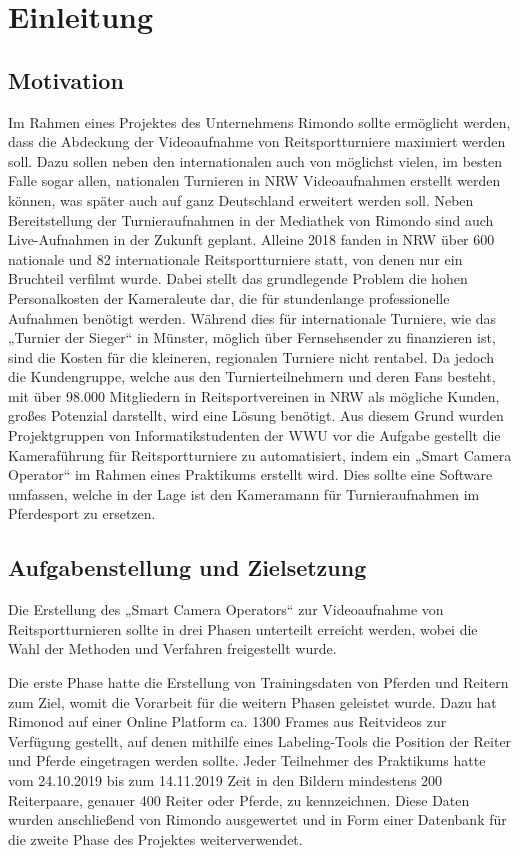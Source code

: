 \chapter{Einleitung}


\section{Motivation}

Im Rahmen eines Projektes des Unternehmens Rimondo sollte ermöglicht werden, dass die Abdeckung der Videoaufnahme von Reitsportturniere maximiert werden soll. Dazu sollen neben den internationalen auch von möglichst vielen, im besten Falle sogar allen, nationalen Turnieren in NRW Videoaufnahmen erstellt werden können, was später auch auf ganz Deutschland erweitert werden soll. Neben Bereitstellung der Turnieraufnahmen in der Mediathek von Rimondo sind auch Live-Aufnahmen in der Zukunft geplant. Alleine 2018 fanden in NRW über 600 nationale und 82 internationale Reitsportturniere statt, von denen nur ein Bruchteil verfilmt wurde.
Dabei stellt das grundlegende Problem die hohen Personalkosten der Kameraleute dar, die für stundenlange professionelle Aufnahmen benötigt werden. Während dies für internationale Turniere, wie das „Turnier der Sieger“ in Münster, möglich über Fernsehsender zu finanzieren ist, sind die Kosten für die kleineren, regionalen Turniere nicht rentabel. Da jedoch die Kundengruppe, welche aus den Turnierteilnehmern und deren Fans besteht, mit über 98.000 Mitgliedern in Reitsportvereinen in NRW als mögliche Kunden, großes Potenzial darstellt, wird eine Lösung benötigt. Aus diesem Grund wurden Projektgruppen von Informatikstudenten der WWU vor die Aufgabe gestellt die Kameraführung für Reitsportturniere zu automatisiert, indem ein „Smart Camera Operator“ im Rahmen eines Praktikums erstellt wird. Dies sollte eine Software umfassen, welche in der Lage ist den Kameramann für Turnieraufnahmen im Pferdesport zu ersetzen.



\section{Aufgabenstellung und Zielsetzung}

Die Erstellung des „Smart Camera Operators“ zur Videoaufnahme von Reitsportturnieren sollte in drei Phasen unterteilt erreicht werden, wobei die Wahl der Methoden und Verfahren freigestellt wurde.

Die erste Phase hatte die Erstellung von Trainingsdaten von Pferden und Reitern zum Ziel, womit die Vorarbeit für die weitern Phasen geleistet wurde. Dazu hat Rimonod auf einer Online Platform ca. 1300 Frames aus Reitvideos zur Verfügung gestellt, auf denen mithilfe eines Labeling-Tools die Position der Reiter und Pferde eingetragen werden sollte. Jeder Teilnehmer des Praktikums hatte vom 24.10.2019 bis zum 14.11.2019 Zeit in den Bildern mindestens 200 Reiterpaare, genauer 400 Reiter oder Pferde, zu kennzeichnen. Diese Daten wurden anschließend von Rimondo ausgewertet und in Form einer Datenbank für die zweite Phase des Projektes weiterverwendet. 

